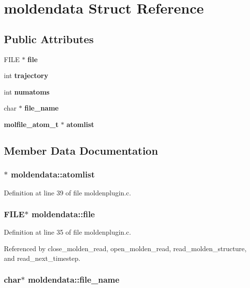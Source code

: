 \section{moldendata  Struct Reference}
\label{structmoldendata}
\subsection*{Public Attributes}
\begin{CompactItemize}
\item 
FILE $\ast$ {\bf file}
\item 
int {\bf trajectory}
\item 
int {\bf numatoms}
\item 
char $\ast$ {\bf file\_\-name}
\item 
{\bf molfile\_\-atom\_\-t} $\ast$ {\bf atomlist}
\end{CompactItemize}


\subsection{Member Data Documentation}
\subsubsection{$\ast$ moldendata::atomlist}\label{structmoldendata_m4}




Definition at line 39 of file moldenplugin.c.
\subsubsection{\setlength{\rightskip}{0pt plus 5cm}FILE$\ast$ moldendata::file}\label{structmoldendata_m0}




Definition at line 35 of file moldenplugin.c.

Referenced by close\_\-molden\_\-read, open\_\-molden\_\-read, read\_\-molden\_\-structure, and read\_\-next\_\-timestep.
\subsubsection{\setlength{\rightskip}{0pt plus 5cm}char$\ast$ moldendata::file\_\-name}\label{structmoldendata_m3}




